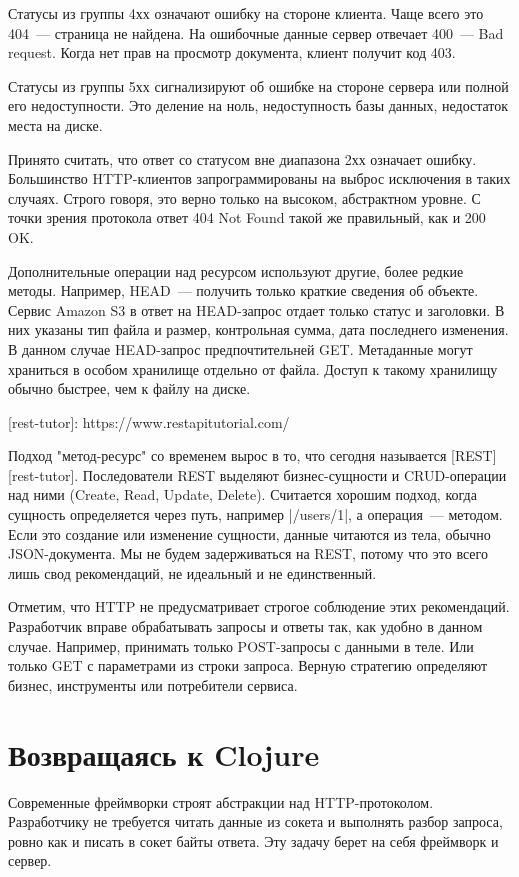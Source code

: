 Статусы из группы 4хх означают ошибку на стороне клиента. Чаще всего это 404~---
страница не найдена. На ошибочные данные сервер отвечает 400~--- Bad
request. Когда нет прав на просмотр документа, клиент получит код 403.

Статусы из группы 5хх сигнализируют об ошибке на стороне сервера или полной его
недоступности. Это деление на ноль, недоступность базы данных, недостаток места
на диске.

Принято считать, что ответ со статусом вне диапазона 2хх означает
ошибку. Большинство HTTP-клиентов запрограммированы на выброс исключения в таких
случаях. Строго говоря, это верно только на высоком, абстрактном уровне. С точки
зрения протокола ответ 404 Not Found такой же правильный, как и 200 OK.

Дополнительные операции над ресурсом используют другие, более редкие
методы. Например, HEAD~--- получить только краткие сведения об объекте. Сервис
Amazon S3 в ответ на HEAD-запрос отдает только статус и заголовки. В них указаны
тип файла и размер, контрольная сумма, дата последнего изменения. В данном
случае HEAD-запрос предпочтительней GET. Метаданные могут храниться в особом
хранилище отдельно от файла. Доступ к такому хранилищу обычно быстрее, чем к
файлу на диске.

[rest-tutor]: https://www.restapitutorial.com/

Подход "метод-ресурс" со временем вырос в то, что сегодня называется
[REST][rest-tutor]. Последователи REST выделяют бизнес-сущности и CRUD-операции
над ними (Create, Read, Update, Delete). Считается хорошим подход, когда
сущность определяется через путь, например \spverb|/users/1|, а операция~---
методом. Если это создание или изменение сущности, данные читаются из тела,
обычно JSON-документа. Мы не будем задерживаться на REST, потому что это всего
лишь свод рекомендаций, не идеальный и не единственный.

Отметим, что HTTP не предусматривает строгое соблюдение этих
рекомендаций. Разработчик вправе обрабатывать запросы и ответы так, как удобно в
данном случае. Например, принимать только POST-запросы с данными в теле. Или
только GET с параметрами из строки запроса. Верную стратегию определяют бизнес,
инструменты или потребители сервиса.

\section{Возвращаясь к Clojure}

Современные фреймворки строят абстракции над HTTP-протоколом. Разработчику не
требуется читать данные из сокета и выполнять разбор запроса, ровно как и писать
в сокет байты ответа. Эту задачу берет на себя фреймворк и сервер.

